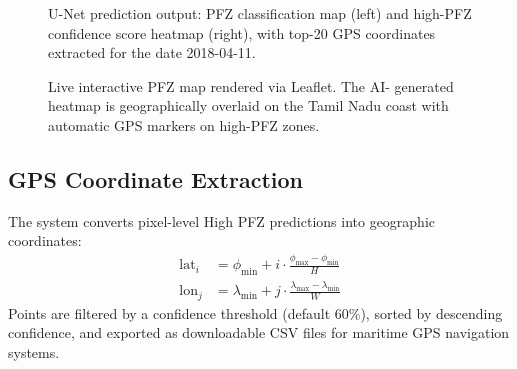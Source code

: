 \documentclass[conference]{IEEEtran}
\begin{document}
\begin{figure}[htbp]
\centering
\caption{U-Net prediction output: PFZ classification map (left) and
high-PFZ confidence score heatmap (right), with top-20 GPS
coordinates extracted for the date 2018-04-11.}
\label{fig:unet_output}
\end{figure}

\begin{figure}[htbp]
\centering
\caption{Live interactive PFZ map rendered via Leaflet. The AI-
generated heatmap is geographically overlaid on the Tamil Nadu
coast with automatic GPS markers on high-PFZ zones.}
\label{fig:livemap}
\end{figure}

\subsection{GPS Coordinate Extraction}

The system converts pixel-level High PFZ predictions into geographic
coordinates:
\begin{align}
\text{lat}_{i} &= \phi_{\min} + i \cdot
  \frac{\phi_{\max} - \phi_{\min}}{H}
  \label{eq:lat}\\
\text{lon}_{j} &= \lambda_{\min} + j \cdot
  \frac{\lambda_{\max} - \lambda_{\min}}{W}
  \label{eq:lon}
\end{align}
Points are filtered by a confidence threshold (default 60\%), sorted
by descending confidence, and exported as downloadable CSV files for
maritime GPS navigation systems.
\end{document}
